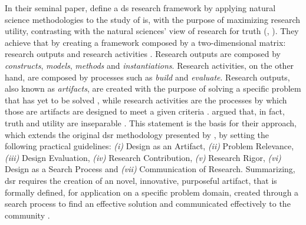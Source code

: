 In their seminal paper, \citeauthor{march1995design} define a \gls{ds} research framework by applying natural science methodologies to the study of \gls{is}, with the purpose of maximizing research utility, contrasting with the natural sciences' view of research for truth (\cite[80]{Hevner:2004:DSI:2017212.2017217}, \cite[253]{march1995design}). They achieve that by creating a framework composed by a two-dimensional matrix: research outputs and research activities \cite[255]{march1995design}. Research outputs are composed by \textit{constructs}, \textit{models}, \textit{methods} and \textit{instantiations}. Research activities, on the other hand, are composed by processes such as \textit{build} and \textit{evaluate}. Research outputs, also known as \textit{artifacts}, are created with the purpose of solving a specific problem that has yet to be solved \cite[78]{Hevner:2004:DSI:2017212.2017217}, while research activities are the processes by which those are artifacts are designed to meet a given criteria \cite[79--80]{Hevner:2004:DSI:2017212.2017217}. \citeauthor{Hevner:2004:DSI:2017212.2017217} argued that, in fact, truth and utility are inseparable \cite[80]{Hevner:2004:DSI:2017212.2017217}. This statement is the basis for their approach, which extends the original \gls{dsr} methodology presented by \citeauthor{march1995design}, by setting the following practical guidelines: \emph{(i)} Design as an Artifact, \emph{(ii)} Problem Relevance, \emph{(iii)} Design Evaluation, \emph{(iv)} Research Contribution, \emph{(v)} Research Rigor, \emph{(vi)} Design as a Search Process and \emph{(vii)} Communication of Research. Summarizing, \gls{dsr} requires the creation of an novel, innovative, purposeful artifact, that is formally defined, for application on a specific problem domain, created through a search process to find an effective solution and communicated effectively to the community \cite[82]{Hevner:2004:DSI:2017212.2017217}.

